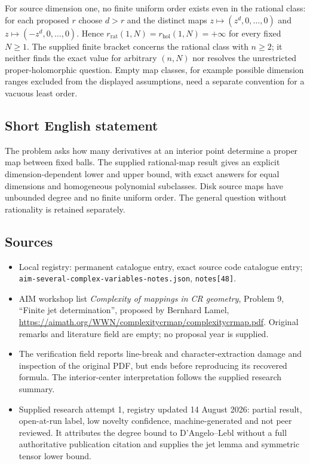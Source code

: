 \documentclass[11pt]{article}
\begin{document}
For source dimension one, no finite uniform order exists even in the rational class: for each proposed $r$ choose $d>r$ and the distinct maps $z\mapsto(z^d,0,\ldots,0)$ and $z\mapsto(-z^d,0,\ldots,0)$. Hence $r_{\mathrm{rat}}(1,N)=r_{\mathrm{hol}}(1,N)=+\infty$ for every fixed $N\geq1$. The supplied finite bracket concerns the rational class with $n\geq2$; it neither finds the exact value for arbitrary $(n,N)$ nor resolves the unrestricted proper-holomorphic question. Empty map classes, for example possible dimension ranges excluded from the displayed assumptions, need a separate convention for a vacuous least order.
\subsection{Short English statement}
The problem asks how many derivatives at an interior point determine a proper map between fixed balls. The supplied rational-map result gives an explicit dimension-dependent lower and upper bound, with exact answers for equal dimensions and homogeneous polynomial subclasses. Disk source maps have unbounded degree and no finite uniform order. The general question without rationality is retained separately.
\subsection{Sources}
\begin{itemize}
\item Local registry: permanent catalogue entry, exact source code catalogue entry; \texttt{aim-several-complex-variables-notes.json}, \texttt{notes[48]}.
\item AIM workshop list \emph{Complexity of mappings in CR geometry}, Problem 9, ``Finite jet determination'', proposed by Bernhard Lamel, \url{https://aimath.org/WWN/complexitycrmap/complexitycrmap.pdf}. Original remarks and literature field are empty; no proposal year is supplied.
\item The verification field reports line-break and character-extraction damage and inspection of the original PDF, but ends before reproducing its recovered formula. The interior-center interpretation follows the supplied research summary.
\item Supplied research attempt 1, registry updated 14 August 2026: partial result, open-at-run label, low novelty confidence, machine-generated and not peer reviewed. It attributes the degree bound to D'Angelo--Lebl without a full authoritative publication citation and supplies the jet lemma and symmetric tensor lower bound.
\end{itemize}
\end{document}
